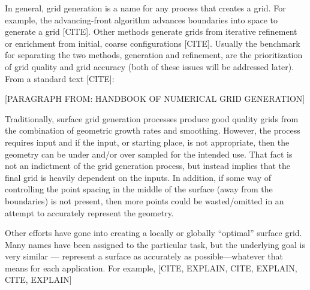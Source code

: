 In general, grid generation is a name for any process that creates a grid. For example, the advancing-front algorithm advances boundaries into space to generate a grid [CITE]. Other methods generate grids from iterative refinement or enrichment from initial, coarse configurations [CITE]. Usually the benchmark for separating the two methods, generation and refinement, are the prioritization of grid quality and grid accuracy (both of these issues will be addressed later). From a standard text [CITE]:

[PARAGRAPH FROM: HANDBOOK OF NUMERICAL GRID GENERATION]

Traditionally, surface grid generation processes produce good quality grids from the combination of geometric growth rates and smoothing. However, the process requires input and if the input, or starting place, is not appropriate, then the geometry can be under and/or over sampled for the intended use. That fact is not an indictment of the grid generation process, but instead implies that the final grid is heavily dependent on the inputs. In addition, if some way of controlling the point spacing in the middle of the surface (away from the boundaries) is not present, then more points could be wasted/omitted in an attempt to accurately represent the geometry.

Other efforts have gone into creating a locally or globally ``optimal'' surface grid. Many names have been assigned to the particular task, but the underlying goal is very similar --- represent a surface as accurately as possible---whatever that means for each application. For example, [CITE, EXPLAIN, CITE, EXPLAIN, CITE, EXPLAIN]
